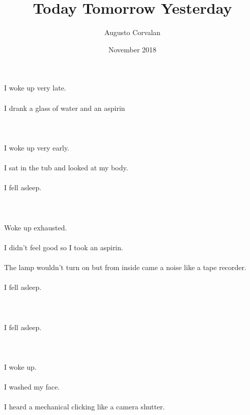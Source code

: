 \documentclass{article}
\title{Today Tomorrow Yesterday}
\date{November 2018}
\author{Augusto Corvalan}
\begin{document}
    
    \section{}
    I woke up very late.\\\\I drank a glass of water and an aspirin\\\\ 
    \newpage
    
    \section{}
    I woke up very early.\\\\I sat in the tub and looked at my body.\\\\I fell asleep.\\\\ 
    \newpage
    
    \section{}
    Woke up exhausted.\\\\I didn't feel good so I took an aspirin.\\\\The lamp wouldn't turn on but from inside came a noise like a tape recorder.\\\\I fell asleep.\\\\ 
    \newpage
    
    \section{}
    I fell asleep.\\\\ 
    \newpage
    
    \section{}
    I woke up.\\\\I washed my face.\\\\I heard a mechanical clicking like a camera shutter.\\\\ 
    \newpage
    
\end{document}
